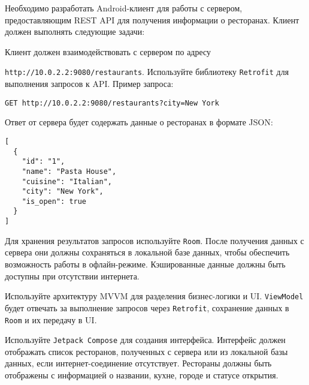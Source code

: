 
Необходимо разработать Android-клиент для работы с сервером, предоставляющим REST API для получения информации о ресторанах. Клиент должен выполнять следующие задачи:

Клиент должен взаимодействовать с сервером по адресу 

\texttt{http://10.0.2.2:9080/restaurants}. Используйте библиотеку \texttt{Retrofit} для выполнения запросов к API. Пример запроса:

\begin{verbatim}
GET http://10.0.2.2:9080/restaurants?city=New York
\end{verbatim}

Ответ от сервера будет содержать данные о ресторанах в формате JSON:

\begin{verbatim}
[
  {
    "id": "1",
    "name": "Pasta House",
    "cuisine": "Italian",
    "city": "New York",
    "is_open": true
  }
]
\end{verbatim}

Для хранения результатов запросов используйте \texttt{Room}. После получения данных с сервера они должны сохраняться в локальной базе данных, чтобы обеспечить возможность работы в офлайн-режиме. Кэшированные данные должны быть доступны при отсутствии интернета.

Используйте архитектуру MVVM для разделения бизнес-логики и UI. \texttt{ViewModel} будет отвечать за выполнение запросов через \texttt{Retrofit}, сохранение данных в \texttt{Room} и их передачу в UI.

Используйте \texttt{Jetpack Compose} для создания интерфейса. Интерфейс должен отображать список ресторанов, полученных с сервера или из локальной базы данных, если интернет-соединение отсутствует. Рестораны должны быть отображены с информацией о названии, кухне, городе и статусе открытия.


